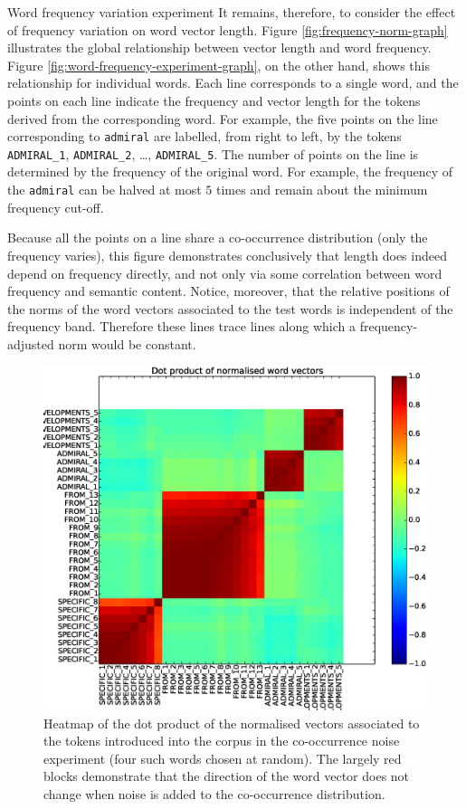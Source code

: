\documentclass{article} %
\newcommand{\word}[1]{\texttt{#1}}
\begin{document}
\begin{section}{Word frequency variation experiment}
It remains, therefore, to consider the effect of frequency variation on word vector length.
Figure \ref{fig:frequency-norm-graph} illustrates the global relationship between vector length and word frequency.
Figure \ref{fig:word-frequency-experiment-graph}, on the other hand, shows this relationship for individual words.
Each line corresponds to a single word, and the points on each line indicate the frequency and vector length for the tokens derived from the corresponding word.
For example, the five points on the line corresponding to \word{admiral} are labelled, from right to left, by the tokens \word{ADMIRAL\_1}, \word{ADMIRAL\_2}, \dots, \word{ADMIRAL\_5}.
The number of points on the line is determined by the frequency of the original word.
For example, the frequency of the \word{admiral} can be halved at most $5$ times and remain about the minimum frequency cut-off.

Because all the points on a line share a co-occurrence distribution (only the frequency varies), this figure demonstrates conclusively that length does indeed depend on frequency directly, and not only via some correlation between word frequency and semantic content.
Notice, moreover, that the relative positions of the norms of the word vectors associated to the test words is independent of the frequency band.
Therefore these lines trace lines along which a frequency-adjusted norm would be constant.


\begin{figure}
	\includegraphics[scale=0.5]{word-frequency-experiment-heatmap}
	\caption{
	Heatmap of the dot product of the normalised vectors associated to the
	tokens introduced into the corpus in the co-occurrence noise experiment
	(four such words chosen at random).  The largely red blocks demonstrate
	that the direction of the word vector does not change when noise is
	added to the co-occurrence distribution.
	}
	\label{fig:cooccurrence-noise-heatmap}
\end{figure}


\end{section}
\end{document}

